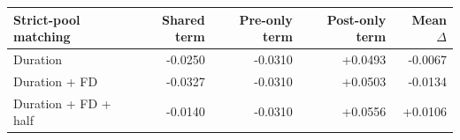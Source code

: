 \begin{tabular}{lrrrr}
\toprule
Strict-pool matching & Shared term & Pre-only term & Post-only term & Mean $\Delta$ \\
\midrule
Duration & -0.0250 & -0.0310 & +0.0493 & -0.0067 \\
Duration + FD & -0.0327 & -0.0310 & +0.0503 & -0.0134 \\
Duration + FD + half & -0.0140 & -0.0310 & +0.0556 & +0.0106 \\
\bottomrule
\end{tabular}

